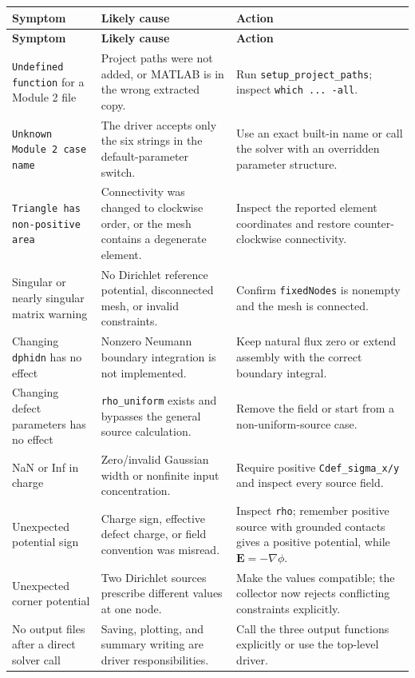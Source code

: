 \documentclass[11pt]{article}
\newcommand{\Evec}{\mathbf{E}}
\begin{document}
\begin{longtable}{p{} p{} p{}}
\toprule
\textbf{Symptom} & \textbf{Likely cause} & \textbf{Action} \\
\midrule
\endfirsthead
\toprule
\textbf{Symptom} & \textbf{Likely cause} & \textbf{Action} \\
\midrule
\endhead
\texttt{Undefined function} for a Module 2 file & Project paths were not added, or MATLAB is in the wrong extracted copy. & Run \texttt{setup\_project\_paths}; inspect \texttt{which ... -all}. \\
\texttt{Unknown Module 2 case name} & The driver accepts only the six strings in the default-parameter switch. & Use an exact built-in name or call the solver with an overridden parameter structure. \\
\texttt{Triangle has non-positive area} & Connectivity was changed to clockwise order, or the mesh contains a degenerate element. & Inspect the reported element coordinates and restore counter-clockwise connectivity. \\
Singular or nearly singular matrix warning & No Dirichlet reference potential, disconnected mesh, or invalid constraints. & Confirm \texttt{fixedNodes} is nonempty and the mesh is connected. \\
Changing \texttt{dphidn} has no effect & Nonzero Neumann boundary integration is not implemented. & Keep natural flux zero or extend assembly with the correct boundary integral. \\
Changing defect parameters has no effect & \texttt{rho\_uniform} exists and bypasses the general source calculation. & Remove the field or start from a non-uniform-source case. \\
NaN or Inf in charge & Zero/invalid Gaussian width or nonfinite input concentration. & Require positive \texttt{Cdef\_sigma\_x/y} and inspect every source field. \\
Unexpected potential sign & Charge sign, effective defect charge, or field convention was misread. & Inspect \texttt{rho}; remember positive source with grounded contacts gives a positive potential, while $\Evec=-\nabla\phi$. \\
Unexpected corner potential & Two Dirichlet sources prescribe different values at one node. & Make the values compatible; the collector now rejects conflicting constraints explicitly. \\
No output files after a direct solver call & Saving, plotting, and summary writing are driver responsibilities. & Call the three output functions explicitly or use the top-level driver. \\

\end{longtable}
\end{document}
